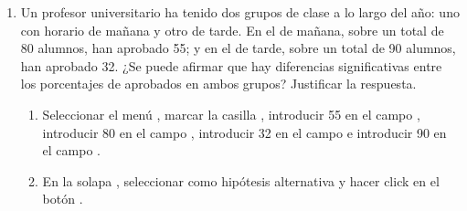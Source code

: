 \begin{enumerate}[leftmargin=*]
\item Un profesor universitario ha tenido dos grupos de clase a lo largo del año: uno con horario de mañana y otro de
tarde. En el de mañana, sobre un total de 80 alumnos, han aprobado 55; y en el de tarde, sobre un total de 90 alumnos,
han aprobado 32. 
¿Se puede afirmar que hay diferencias significativas entre los porcentajes de aprobados en ambos grupos? 
Justificar la respuesta.
\begin{indicacion}
\begin{enumerate}
\item Seleccionar el menú , marcar la casilla , introducir 55 en el campo , introducir 80 en el campo
, introducir 32 en el campo  e introducir 90 en el campo
.
\item En la solapa , seleccionar como hipótesis alternativa  y hacer click
en el botón .
\end{enumerate}
\end{indicacion}

\end{enumerate}


